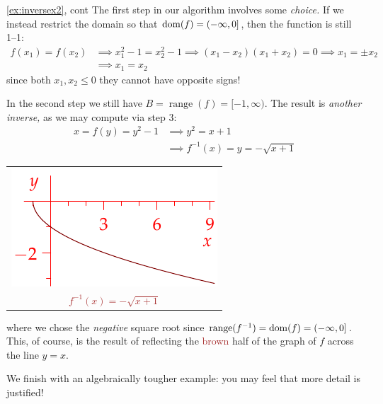 \begin{example*}{\ref{ex:inversex2}, cont}{}
The first step in our algorithm involves some \emph{choice.} If we instead restrict the domain so that $\operatorname{dom}(f)=(-\infty,0]$, then the function is still 1--1:
\begin{align*}
f(x_1)=f(x_2)&\implies x_1^2-1=x_2^2-1 \implies (x_1-x_2)(x_1+x_2)=0 \implies x_1=\pm x_2\\
&\implies x_1=x_2
\end{align*}
since both $x_1,x_2\le 0$ they cannot have opposite signs!\par
\begin{minipage}[t]{0.7\linewidth}\vspace{-5pt}
In the second step we still have $B=\operatorname{range}(f)=[-1,\infty)$. The result is \emph{another inverse,} as we may compute via step 3:
\begin{align*}
x=f(y)=y^2-1&\implies y^2=x+1\\
&\implies f^{-1}(x)=y=-\sqrt{x+1}
\end{align*}
\end{minipage}\hfill\begin{minipage}[t]{0.29\linewidth}\vspace{-30pt}
\flushright\begin{tabular}{@{}c@{}}
\includegraphics{inverses-poly5}\\
\textcolor{Brown}{$f^{-1}(x)=-\sqrt{x+1}$}
\end{tabular}
\end{minipage}\medbreak
where we chose the \emph{negative} square root since $\operatorname{range}(f^{-1})=\operatorname{dom}(f)=(-\infty,0]$. This, of course, is the result of reflecting the  \textcolor{Brown}{brown} half of the graph of $f$ across the line $y=x$.
\end{example*}

\goodbreak

\fi

We finish with an algebraically tougher example: you may feel that more detail is justified!

